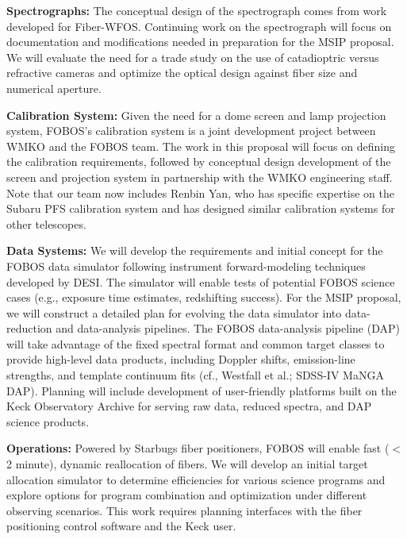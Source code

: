 \noindent \textbf{Spectrographs:} The conceptual design of the
spectrograph comes from work developed for Fiber-WFOS. Continuing
work on the spectrograph will focus on documentation and
modifications needed in preparation for the MSIP proposal. We will
evaluate the need for a trade study on the use of catadioptric versus
refractive cameras and optimize the optical design against fiber size
and numerical aperture.

\noindent \textbf{Calibration System:} Given the need for a dome
screen and lamp projection system, FOBOS's calibration system is a
joint development project between WMKO and the FOBOS team. The work
in this proposal will focus on defining the calibration requirements,
followed by conceptual design development of the screen and
projection system in partnership with the WMKO engineering staff.
Note that our team now includes Renbin Yan, who has specific
expertise on the Subaru PFS calibration system and has designed
similar calibration systems for other telescopes.


\noindent \textbf{Data Systems:} We will develop the requirements and
initial concept for the FOBOS data simulator following instrument
forward-modeling techniques developed by DESI. The simulator will
enable tests of potential FOBOS science cases (e.g., exposure time
estimates, redshifting success). For the MSIP proposal, we will
construct a detailed plan for evolving the data simulator into
data-reduction and data-analysis pipelines. The FOBOS data-analysis
pipeline (DAP) will take advantage of the fixed spectral format and
common target classes to provide high-level data products, including
Doppler shifts, emission-line strengths, and template continuum fits
(cf., Westfall et al.; SDSS-IV MaNGA DAP). Planning will include
development of user-friendly platforms built on the Keck Observatory
Archive for serving raw data, reduced spectra, and DAP science
products.

\noindent \textbf{Operations:} Powered by Starbugs fiber positioners,
FOBOS will enable fast ($<$2 minute), dynamic reallocation of fibers. We will
develop an initial target allocation simulator to determine
efficiencies for various science programs and explore options for
program combination and optimization under different observing
scenarios. This work requires planning interfaces with the fiber
positioning control software and the Keck user.

